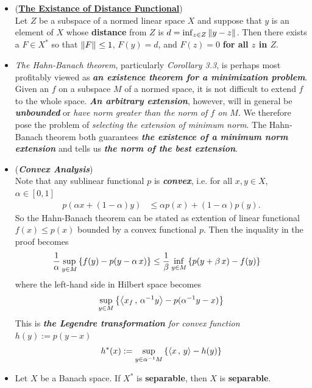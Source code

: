 \documentclass[11pt]{article}
\begin{document}
\begin{itemize}
\item \begin{corollary}(\underline{\textbf{The Existance of Distance Functional}})\\
Let $Z$ be a subspace of a normed linear space $X$ and suppose that $y$ is an element of $X$ whose \textbf{distance} from $Z$ is $d = \inf_{z \in Z}\left\|y -z\right\|_{}$. Then there
exists a $F \in X^{*}$ so that $\left\|F\right\|_{} \le 1$, $F(y) = d$, and $F(z) = 0$ \textbf{for all $z$ in $Z$}.
\end{corollary}

\item \begin{remark}
\emph{The Hahn-Banach theorem}, particularly \emph{Corollary 3.3}, is perhaps most profitably viewed as \emph{\textbf{an existence theorem for a minimization problem}}. Given an $f$ on a subspace $M$ of a normed space, it is not difficult to extend $f$ to the whole space. \emph{\textbf{An arbitrary extension}}, however, will in general be \emph{\textbf{unbounded}} or \emph{have norm greater than the norm of $f$ on $M$}. We therefore pose the problem of \emph{selecting the extension of minimum norm}. The Hahn-Banach theorem both guarantees \emph{\textbf{the existence of a minimum norm extension}} and tells us \emph{\textbf{the norm of the best extension}}.
\end{remark}

\item \begin{remark} (\emph{\textbf{Convex Analysis}})\\
Note that any sublinear functional $p$ is \emph{\textbf{convex}}, i.e. for all $x, y \in X$, $\alpha \in [0, 1]$
\begin{align*}
p(\alpha x + (1- \alpha) y) &\le \alpha p(x) + (1- \alpha) p(y).
\end{align*} So the Hahn-Banach theorem can be stated as extention of linear functional $f(x) \le p(x)$ bounded by a convex functional $p$. Then the inquality in the proof becomes 
\begin{align*}
\frac{1}{\alpha}\sup_{y \in M}\left\{f(y) - p(y - \alpha\,x)\right\} &\le \frac{1}{\beta}\inf_{y \in M}\left\{p(y + \beta\,x) - f(y)\right\}
\end{align*} where the left-hand side in Hilbert space becomes
\begin{align*}
\sup_{y \in M}\left\{\left\langle x_f\,,\, \alpha^{-1}y \right\rangle - p(\alpha^{-1}y - x)\right\}
\end{align*} This is \emph{\textbf{the Legendre transformation} for convex function} $h(y):= p(y - x)$
\begin{align*}
h^{*}(x) := \sup_{y \in \alpha^{-1} M}\left\{\left\langle x\,,\, y \right\rangle - h(y)\right\}
\end{align*}
\end{remark}

\item \begin{proposition}
Let $X$ be a Banach space. If $X^{*}$ is \textbf{separable}, then $X$ is \textbf{separable}.
\end{proposition}
\end{itemize}
\end{document}
